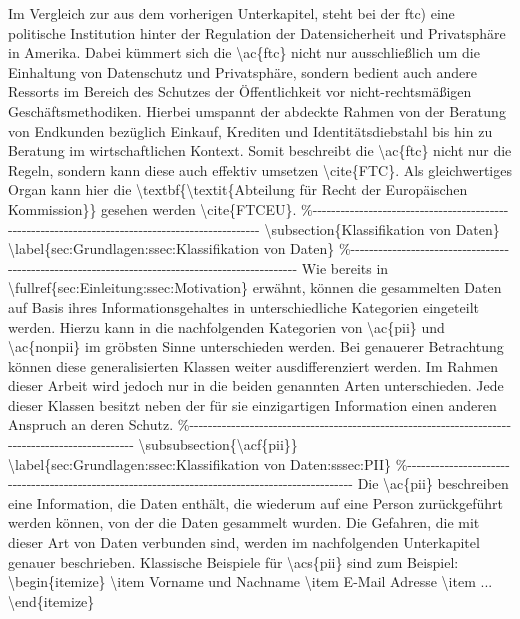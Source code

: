 Im Vergleich zur  aus dem vorherigen Unterkapitel, steht bei der \acl{ftc) eine politische Institution hinter der Regulation der Datensicherheit und Privatsphäre in Amerika. Dabei kümmert sich die \ac{ftc} nicht nur ausschließlich um die Einhaltung von Datenschutz und Privatsphäre, sondern bedient auch andere Ressorts im Bereich des Schutzes der Öffentlichkeit vor nicht-rechtsmäßigen Geschäftsmethodiken. Hierbei umspannt der abdeckte Rahmen von der Beratung von Endkunden bezüglich Einkauf, Krediten und Identitätsdiebstahl bis hin zu Beratung im wirtschaftlichen Kontext. Somit beschreibt die \ac{ftc} nicht nur die Regeln, sondern kann diese auch effektiv umsetzen \cite{FTC}. Als gleichwertiges Organ kann hier die \textbf{\textit{Abteilung für Recht der Europäischen Kommission}} gesehen werden \cite{FTCEU}.

\subsection{Klassifikation von Daten}
\label{sec:Grundlagen:ssec:Klassifikation von Daten}

Wie bereits in \fullref{sec:Einleitung:ssec:Motivation} erwähnt, können die gesammelten Daten auf Basis ihres Informationsgehaltes in unterschiedliche Kategorien eingeteilt werden. Hierzu kann in die nachfolgenden Kategorien von \ac{pii} und \ac{nonpii} im gröbsten Sinne unterschieden werden. Bei genauerer Betrachtung können diese generalisierten Klassen weiter ausdifferenziert werden. Im Rahmen dieser Arbeit wird jedoch nur in die beiden genannten Arten unterschieden. Jede dieser Klassen besitzt neben der für sie einzigartigen Information einen anderen Anspruch an deren Schutz.

\subsubsection{\acf{pii}}
\label{sec:Grundlagen:ssec:Klassifikation von Daten:sssec:PII}
Die \ac{pii} beschreiben eine Information, die Daten enthält, die wiederum auf eine Person zurückgeführt werden können, von der die Daten gesammelt wurden. Die Gefahren, die mit dieser Art von Daten verbunden sind, werden im nachfolgenden Unterkapitel genauer beschrieben. Klassische Beispiele für \acs{pii} sind zum Beispiel:
\begin{itemize}
\item Vorname und Nachname
\item E-Mail Adresse
\item ...
\end{itemize}

}
